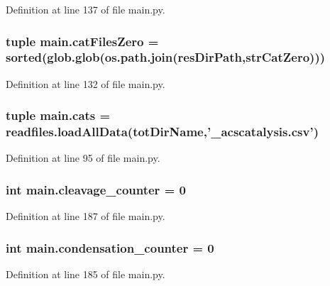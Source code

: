 Definition at line 137 of file main.\-py.

\hypertarget{a00111_a7ab6089d577bd60acf22b92e84930523}{
\subsubsection[{cat\-Files\-Zero}]{\setlength{\rightskip}{0pt plus 5cm}tuple main.\-cat\-Files\-Zero = sorted(glob.\-glob(os.\-path.\-join({\bf res\-Dir\-Path},{\bf str\-Cat\-Zero})))}}\label{a00111_a7ab6089d577bd60acf22b92e84930523}


Definition at line 132 of file main.\-py.

\hypertarget{a00111_adc0282a6415a88834556e66807bcc800}{
\subsubsection[{cats}]{\setlength{\rightskip}{0pt plus 5cm}tuple main.\-cats = readfiles.\-load\-All\-Data({\bf tot\-Dir\-Name},'\-\_\-acscatalysis.\-csv')}}\label{a00111_adc0282a6415a88834556e66807bcc800}


Definition at line 95 of file main.\-py.

\hypertarget{a00111_aba28788973ae3e9140b53078efe5d204}{
\subsubsection[{cleavage\-\_\-counter}]{\setlength{\rightskip}{0pt plus 5cm}int main.\-cleavage\-\_\-counter = 0}}\label{a00111_aba28788973ae3e9140b53078efe5d204}


Definition at line 187 of file main.\-py.

\hypertarget{a00111_a358b60986e7e25df0dfb61562b7aa3e2}{
\subsubsection[{condensation\-\_\-counter}]{\setlength{\rightskip}{0pt plus 5cm}int main.\-condensation\-\_\-counter = 0}}\label{a00111_a358b60986e7e25df0dfb61562b7aa3e2}


Definition at line 185 of file main.\-py.

